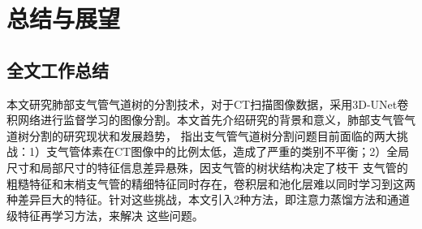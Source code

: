 
\chapter{总结与展望}\label{chap:summary_and_outlook}

\section{全文工作总结}

本文研究肺部支气管气道树的分割技术，对于CT扫描图像数据，采用3D-UNet卷积网络进行监督学习的图像分割。本文首先介绍研究的背景和意义，肺部支气管气道树分割的研究现状和发展趋势，
指出支气管气道树分割问题目前面临的两大挑战：1）支气管体素在CT图像中的比例太低，造成了严重的类别不平衡；2）全局尺寸和局部尺寸的特征信息差异悬殊，因支气管的树状结构决定了枝干
支气管的粗糙特征和末梢支气管的精细特征同时存在，卷积层和池化层难以同时学习到这两种差异巨大的特征。针对这些挑战，本文引入2种方法，即注意力蒸馏方法和通道级特征再学习方法，来解决
这些问题。

